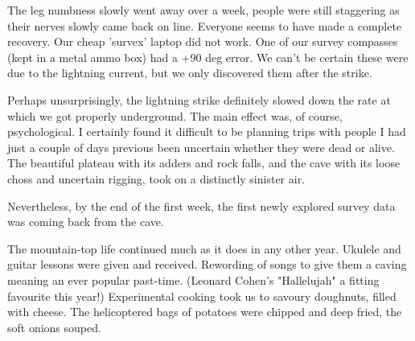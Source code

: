 The leg numbness slowly went away over a week, people were still staggering as their nerves slowly came back on line. Everyone seems to have made a complete recovery. Our cheap 'survex' laptop did not work. One of our survey compasses (kept in a metal ammo box) had a +90 deg error. We can't be certain these were due to the lightning current, but we only discovered them after the strike.

Perhaps unsurprisingly, the lightning strike definitely slowed down the rate at which we got properly underground.  The main effect was, of course, psychological. I certainly found it difficult to be planning trips with people I had just a couple of days previous been uncertain whether they were dead or alive. The beautiful plateau with its adders and rock falls, and the cave with its loose choss and uncertain rigging, took on a distinctly sinister air.

Nevertheless, by the end of the first week, the first newly explored survey data was coming back from the cave.

The mountain-top life continued much as it does in any other year. Ukulele and guitar lessons were given and received. Rewording of songs to give them a caving meaning an ever popular past-time. (Leonard Cohen's "Hallelujah" a fitting favourite this year!) Experimental cooking took us to savoury doughnuts, filled with cheese. The helicoptered bags of potatoes were chipped and deep fried, the soft onions souped.



